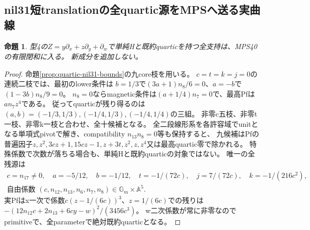 \documentclass[a4paper,11pt]{ltjsarticle}
\newtheorem{proposition}{命題}[section]
\theoremstyle{definition}
\begin{document}
\subsection{nil31短translationの全quartic源をMPSへ送る実曲線}
\begin{proposition}\label{prop:nil31-short-quartic-MPS}
型4の$Z=y\partial_x+z\partial_y+\partial_w$で単純Hと既約quarticを持つ全支持は、MPS40の有限閉和に入る。
新成分を追加しない。
\end{proposition}
\begin{proof}
命題\ref{prop:quartic-nil31-bounds}の九core枝を用いる。
$c=t=k=j=0$の連続二枝では、最初のlower条件は
$b=1/3$で$(3a+1)n_8/6=0$、$a=-b$で$(1-3b)n_8/9=0$。
$n_8=0$ならmagnetic条件は$(a+1/4)n_7=0$で、最高Pfは$an_7z^4$である。
従ってquarticが残り得るのは$(a,b)=(-1/3,1/3),(-1/4,1/3),(-1/4,1/4)$の三組。
非零c五枝、非零t一枝、非零k一枝と合わせ、全十候補となる。
全二段線形系を各許容域でunitとなる単項式pivotで解き、compatibility $n_{13}n_8=0$等も保持すると、
九候補はPfの普遍因子$z,z^2,3cz+1,15cz-1,z+3t,z^2,z,z^4$又は最高quartic零で除かれる。
特殊係数で次数が落ちる場合も、単純Hと既約quarticの対象ではない。
唯一の全残源は
\[
 \begin{gathered}
 c=n_{17}\ne0,\quad a=-5/12,\quad b=-1/12,\quad
 t=-1/(72c),\quad j=7/(72c),\quad k=-1/(216c^2),\\
 \text{自由係数 }(c,n_{12},n_{13},n_6,n_7,n_8)\in\mathbb G_m\times\mathbb A^5.
 \end{gathered}
\]
実Pfはx一次で係数$c(z-1/(6c))^3$、$z=1/(6c)$での残りは
$-(12n_{12}c+2n_{13}+6cy-w)^2/(3456c^3)$。
w二次係数が常に非零なのでprimitiveで、全parameterで絶対既約quarticとなる。


\end{proof}
\end{document}

